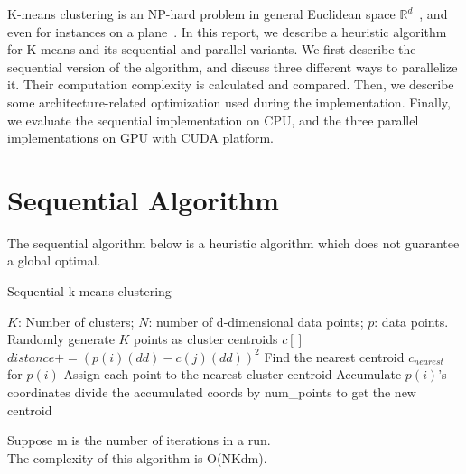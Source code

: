 K-means clustering is an NP-hard problem in general Euclidean space 
$\mathbb{R}^d$~\cite{k-means-euclidean},
and even for instances on a plane~\cite{k-means-plane}. 
In this report, we describe a heuristic algorithm for K-means and its 
sequential and parallel variants.
We first describe the sequential version of the algorithm, and discuss three 
different ways to parallelize it. Their computation complexity is calculated and
compared.
Then, we describe some architecture-related optimization used during
the implementation.
Finally, we evaluate the sequential implementation on CPU,
and the three parallel implementations on GPU with CUDA platform.

\section{Sequential Algorithm}
The sequential algorithm below is a heuristic algorithm which does not guarantee
a global optimal. 

\begin{algorithm}
  \caption{Sequential k-means clustering} \label{seq}
  \begin{algorithmic}[1]
    \INPUT $K$: Number of clusters; $N$: number of d-dimensional data points; $p$: data points. 
    \State Randomly generate $K$ points as cluster centroids $c[]$
    \State $distance += (p(i)(dd) - c(j)(dd))^2$
    \EndFor
    \EndFor
    \State Find the nearest centroid $c_{nearest}$ for $p(i)$
    \State Assign each point to the nearest cluster centroid
    \State Accumulate $p(i)$'s coordinates
    \State divide the accumulated coords by num\_points to get the new centroid
    \EndFor
    \EndWhile
    \EndFunction
  \end{algorithmic}
\end{algorithm}

\vspace{5mm}
\noindent
Suppose m is the number of iterations in a run. \\
The complexity of this algorithm is O(NKdm). 
